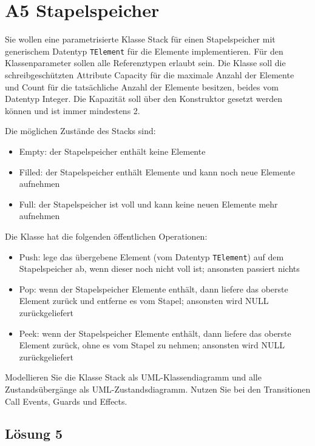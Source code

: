 \documentclass[main.tex]{subfiles}
\begin{document}
\section{A5 Stapelspeicher}
Sie wollen eine parametrisierte Klasse Stack für einen Stapelspeicher mit generischem Datentyp \texttt{TElement} für die Elemente implementieren. Für den Klassenparameter sollen alle Referenztypen erlaubt sein. Die Klasse soll die schreibgeschützten Attribute Capacity für die maximale Anzahl der Elemente und Count für die tatsächliche Anzahl der Elemente besitzen, beides vom Datentyp Integer.
Die Kapazität soll über den Konstruktor gesetzt werden können und ist immer mindestens 2.

Die möglichen Zustände des Stacks sind:
\begin{itemize}
    \item Empty: der Stapelspeicher enthält keine Elemente
    \item Filled: der Stapelspeicher enthält Elemente und kann noch neue Elemente aufnehmen
    \item Full: der Stapelspeicher ist voll und kann keine neuen Elemente mehr aufnehmen
\end{itemize}

Die Klasse hat die folgenden öffentlichen Operationen:
\begin{itemize}
    \item Push: lege das übergebene Element (vom Datentyp \texttt{TElement}) auf dem Stapelspeicher ab, wenn dieser noch nicht voll ist; ansonsten passiert nichts
    \item Pop: wenn der Stapelspeicher Elemente enthält, dann liefere das oberste Element zurück und entferne es vom Stapel; ansonsten wird NULL zurückgeliefert
    \item Peek: wenn der Stapelspeicher Elemente enthält, dann liefere das oberste Element zurück, ohne es vom Stapel zu nehmen; ansonsten wird NULL zurückgeliefert
\end{itemize}

Modellieren Sie die Klasse Stack als UML-Klassendiagramm und alle Zustandsübergänge als UML-Zustandsdiagramm. Nutzen Sie bei den Transitionen Call Events, Guards und Effects.

\subsection{Lösung 5}
\end{document}
